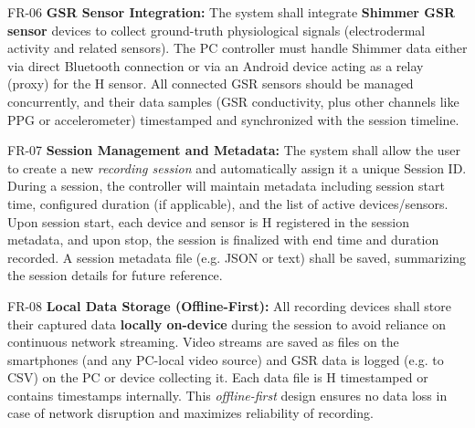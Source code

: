   FR-06                   \textbf{GSR Sensor Integration:} The system shall integrate \textbf{Shimmer GSR sensor} devices to collect ground-truth physiological signals (electrodermal activity and related sensors). The PC controller must handle Shimmer data either via direct Bluetooth connection or via an Android device acting as a relay (proxy) for the                                                     H
                          sensor\cite{ref2}. All connected GSR sensors should be managed concurrently, and their data samples (GSR conductivity, plus other channels like PPG or accelerometer) timestamped and synchronized with the session timeline.                             

  FR-07                   \textbf{Session Management and Metadata:} The system shall allow the user to create a new \textit{recording session} and automatically assign it a unique Session ID. During a session, the controller will maintain metadata including session start time, configured duration (if applicable), and the list of active devices/sensors. Upon session start, each device and sensor is         H
                          registered in the session metadata, and upon stop, the session is finalized with end time and duration                                                                                                                                                                                                                                                                             
                          recorded\cite{ref3}\cite{ref4}. A session metadata file (e.g. JSON or      
                          text) shall be saved, summarizing the session details for future reference.                                                                                                                                                                                                                                                                                                        

  FR-08                   \textbf{Local Data Storage (Offline-First):} All recording devices shall store their captured data \textbf{locally on-device} during the session to avoid reliance on continuous network streaming. Video streams are saved as files on the smartphones (and any PC-local video source) and GSR data is logged (e.g. to CSV) on the PC or device collecting it. Each data file is            H
                          timestamped or contains timestamps internally. This \textit{offline-first} design ensures no data loss in case of network disruption and maximizes reliability of recording.                                                                                                                                                                                                              

